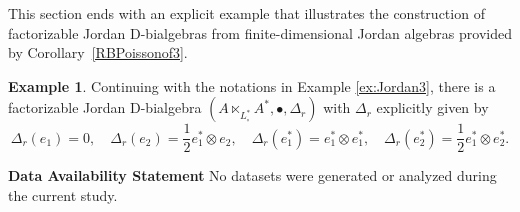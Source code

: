 \documentclass[12pt, reqno, a4paper]{amsart}
\theoremstyle{definition}
\newtheorem{example}[theorem]{Example}
\begin{document}
This section ends with an explicit example that illustrates the construction of factorizable Jordan D-bialgebras from finite-dimensional Jordan algebras provided by Corollary~\ref{RBPoissonof3}.

\begin{example}\label{FJordanDB1}
	Continuing with the notations in Example \ref{ex:Jordan3}, 	
	there is a factorizable Jordan D-bialgebra $(A \ltimes_{L_{\circ}^{*}} A^{*}, \bullet, \Delta_r)$ with $\Delta_{r}$ explicitly given by
	\begin{equation*}
		\Delta_r(e_1)  = 0, \quad
		\Delta_r(e_2) = \frac{1}{2} e_1^* \otimes e_2, \quad
		\Delta_r(e_1^*) = e_1^* \otimes e_1^*, \quad 
		\Delta_r(e_2^*) = \frac{1}{2} e_1^* \otimes e_2^*.
	\end{equation*}
\end{example}


\bigskip

\noindent \textbf{Data Availability Statement} No datasets were generated or analyzed during the current study. 







%
\end{document}
